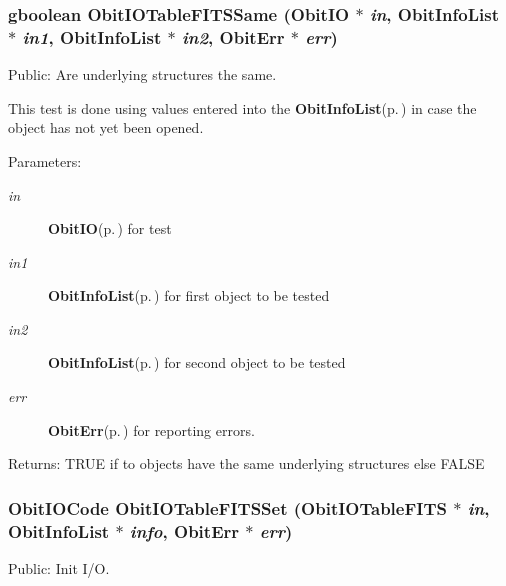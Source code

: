 \subsubsection{\setlength{\rightskip}{0pt plus 5cm}gboolean Obit\-IOTable\-FITSSame ({\bf Obit\-IO} $\ast$ {\em in}, {\bf Obit\-Info\-List} $\ast$ {\em in1}, {\bf Obit\-Info\-List} $\ast$ {\em in2}, {\bf Obit\-Err} $\ast$ {\em err})}\label{ObitIOTableFITS_8c_a14}


Public: Are underlying structures the same. 

This test is done using values entered into the {\bf Obit\-Info\-List}{\rm (p.\,\pageref{structObitInfoList})} in case the object has not yet been opened. \begin{Desc}
\item[Parameters:]
\begin{description}
\item[{\em in}]{\bf Obit\-IO}{\rm (p.\,\pageref{structObitIO})} for test \item[{\em in1}]{\bf Obit\-Info\-List}{\rm (p.\,\pageref{structObitInfoList})} for first object to be tested \item[{\em in2}]{\bf Obit\-Info\-List}{\rm (p.\,\pageref{structObitInfoList})} for second object to be tested \item[{\em err}]{\bf Obit\-Err}{\rm (p.\,\pageref{structObitErr})} for reporting errors. \end{description}
\end{Desc}
\begin{Desc}
\item[Returns:]TRUE if to objects have the same underlying structures else FALSE \end{Desc}
\subsubsection{\setlength{\rightskip}{0pt plus 5cm}Obit\-IOCode Obit\-IOTable\-FITSSet ({\bf Obit\-IOTable\-FITS} $\ast$ {\em in}, {\bf Obit\-Info\-List} $\ast$ {\em info}, {\bf Obit\-Err} $\ast$ {\em err})}\label{ObitIOTableFITS_8c_a20}


Public: Init I/O. 

